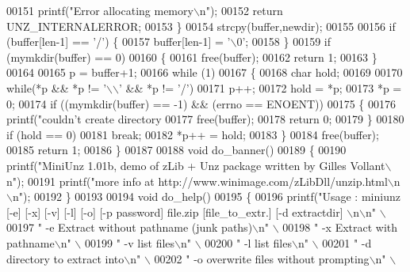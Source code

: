\begin{DoxyCode}
{00151                 printf(\textcolor{stringliteral}{"Error allocating memory\(\backslash\)n"});
00152                 \textcolor{keywordflow}{return} UNZ\_INTERNALERROR;
00153         \}
00154   strcpy(buffer,newdir);
00155 
00156   \textcolor{keywordflow}{if} (buffer[len-1] == \textcolor{charliteral}{'/'}) \{
00157     buffer[len-1] = \textcolor{charliteral}{'\(\backslash\)0'};
00158   \}
00159   \textcolor{keywordflow}{if} (mymkdir(buffer) == 0)
00160     \{
00161       free(buffer);
00162       \textcolor{keywordflow}{return} 1;
00163     \}
00164 
00165   p = buffer+1;
00166   \textcolor{keywordflow}{while} (1)
00167     \{
00168       \textcolor{keywordtype}{char} hold;
00169 
00170       \textcolor{keywordflow}{while}(*p && *p != \textcolor{charliteral}{'\(\backslash\)\(\backslash\)'} && *p != \textcolor{charliteral}{'/'})
00171         p++;
00172       hold = *p;
00173       *p = 0;
00174       \textcolor{keywordflow}{if} ((mymkdir(buffer) == -1) && (errno == ENOENT))
00175         \{
00176           printf(\textcolor{stringliteral}{"couldn't create directory %
00177           free(buffer);
00178           \textcolor{keywordflow}{return} 0;
00179         \}
00180       \textcolor{keywordflow}{if} (hold == 0)
00181         \textcolor{keywordflow}{break};
00182       *p++ = hold;
00183     \}
00184   free(buffer);
00185   \textcolor{keywordflow}{return} 1;
00186 \}
00187 
00188 \textcolor{keywordtype}{void} do\_banner()
00189 \{
00190     printf(\textcolor{stringliteral}{"MiniUnz 1.01b, demo of zLib + Unz package written by Gilles Vollant\(\backslash\)n"});
00191     printf(\textcolor{stringliteral}{"more info at http://www.winimage.com/zLibDll/unzip.html\(\backslash\)n\(\backslash\)n"});
00192 \}
00193 
00194 \textcolor{keywordtype}{void} do\_help()
00195 \{
00196     printf(\textcolor{stringliteral}{"Usage : miniunz [-e] [-x] [-v] [-l] [-o] [-p password] file.zip [file\_to\_extr.] [-d extractdir]
      \(\backslash\)n\(\backslash\)n"} \(\backslash\)
00197            \textcolor{stringliteral}{"  -e  Extract without pathname (junk paths)\(\backslash\)n"} \(\backslash\)
00198            \textcolor{stringliteral}{"  -x  Extract with pathname\(\backslash\)n"} \(\backslash\)
00199            \textcolor{stringliteral}{"  -v  list files\(\backslash\)n"} \(\backslash\)
00200            \textcolor{stringliteral}{"  -l  list files\(\backslash\)n"} \(\backslash\)
00201            \textcolor{stringliteral}{"  -d  directory to extract into\(\backslash\)n"} \(\backslash\)
00202            \textcolor{stringliteral}{"  -o  overwrite files without prompting\(\backslash\)n"} \(\backslash\)
}}
\end{DoxyCode}
